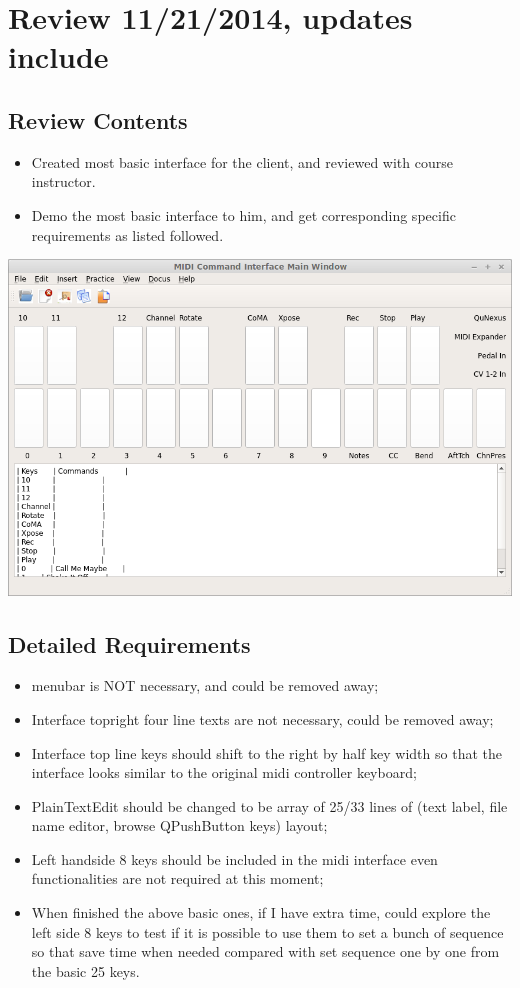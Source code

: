 \documentclass[9pt,b5paper]{article}
\begin{document}
\section{Review 11/21/2014, updates include}
\label{sec-4}
\subsection{Review Contents}
\label{sec-4-1}
\begin{itemize}
\item Created most basic interface for the client, and reviewed with course instructor.
\item Demo the most basic interface to him, and get corresponding specific requirements as listed followed.
\end{itemize}

\includegraphics[width=.9\linewidth]{./pic/2014-11-20_21:52:19.png}

\subsection{Detailed Requirements}
\label{sec-4-2}
\begin{itemize}
\item menubar is NOT necessary, and could be removed away;
\item Interface topright four line texts are not necessary, could be removed away;
\item Interface top line keys should shift to the right by half key width so that the interface looks similar to the original midi controller keyboard;
\item PlainTextEdit should be changed to be array of 25/33 lines of (text label, file name editor, browse QPushButton keys) layout;
\item Left handside 8 keys should be included in the midi interface even functionalities are not required at this moment;
\item When finished the above basic ones, if I have extra time, could explore the left side 8 keys to test if it is possible to use them to set a bunch of sequence so that save time when needed compared with set sequence one by one from the basic 25 keys.
\end{itemize}
\end{document}
